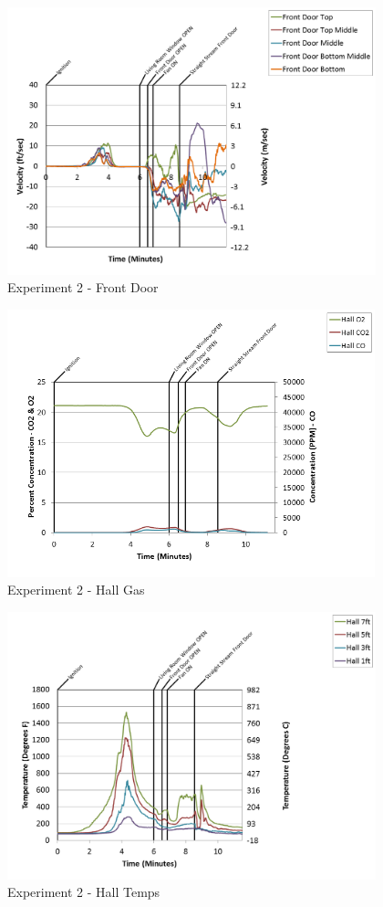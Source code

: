 \documentclass{article}
\begin{document}
\begin{appendices}
\clearpage

\begin{figure}[h!]
	\centering
	\includegraphics[height=3.05in]{0_Images/Results_Charts/Exp_2_Charts/FrontDoor.png}
	\caption{Experiment 2 - Front Door}
\end{figure}


\begin{figure}[h!]
	\centering
	\includegraphics[height=3.05in]{0_Images/Results_Charts/Exp_2_Charts/HallGas.png}
	\caption{Experiment 2 - Hall Gas}
\end{figure}

\clearpage

\begin{figure}[h!]
	\centering
	\includegraphics[height=3.05in]{0_Images/Results_Charts/Exp_2_Charts/HallTemps.png}
	\caption{Experiment 2 - Hall Temps}
\end{figure}



\end{appendices}
\end{document}
